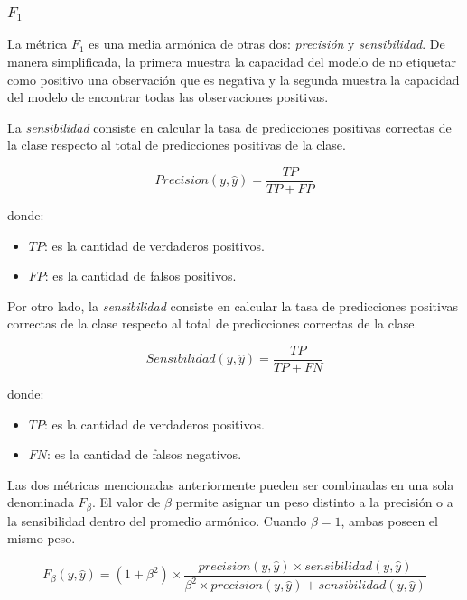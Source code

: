 \subsubsection{$F_{1}$}

La métrica $F_{1}$ es una media armónica de otras dos: {\it precisión} y {\it sensibilidad}. De manera simplificada, la
primera muestra la capacidad del modelo de no etiquetar como positivo una observación que es negativa y la segunda
muestra la capacidad del modelo de encontrar todas las observaciones positivas.

La {\it sensibilidad} consiste en calcular la tasa de predicciones positivas correctas de la clase respecto al total de
predicciones positivas de la clase.

\begin{equation}
    Precision(y, \hat{y}) = \frac{TP}{TP + FP}
\end{equation}

\noindent
donde:
\begin{itemize}
    \item $TP$: es la cantidad de verdaderos positivos.
    \item $FP$: es la cantidad de falsos positivos.
\end{itemize}

Por otro lado, la {\it sensibilidad} consiste en calcular la tasa de predicciones positivas correctas de la clase
respecto al total de predicciones correctas de la clase.

\begin{equation}
    Sensibilidad(y, \hat{y}) = \frac{TP}{TP + FN}
\end{equation}

\noindent
donde:
\begin{itemize}
    \item $TP$: es la cantidad de verdaderos positivos.
    \item $FN$: es la cantidad de falsos negativos.
\end{itemize}

Las dos métricas mencionadas anteriormente pueden ser combinadas en una sola denominada $F_{\beta}$. El valor de
$\beta$ permite asignar un peso distinto a la precisión o a la sensibilidad dentro del promedio armónico. Cuando
$\beta=1$, ambas poseen el mismo peso.

\begin{equation}
    F_{\beta}(y, \hat{y}) = (1 + \beta^2) \times \frac{precision(y, \hat{y}) \times sensibilidad(y, \hat{y})}{\beta^2 \times precision(y, \hat{y}) + sensibilidad(y, \hat{y})}
\end{equation}

